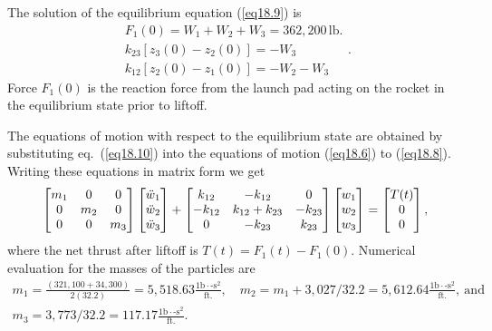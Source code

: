 \documentclass{AeroStructure-ERJohnson}
\begin{document}
The solution of the equilibrium equation (\ref{eq18.9}) is
\begin{equation}\label{eq18.10}
\begin{split}
F_{1}(0)=W_{1}+W_{2}+W_{3}=362{,}200\,\mathrm{lb}. \\k_{23}\left[z_{3}(0)-z_{2}(0)\right]=-W_{3} \\k_{12}\left[z_{2}(0)-z_{1}(0)\right]=-W_{2}-W_{3}
\end{split}.
\end{equation}
Force $F_{1}(0)$ is the reaction force from the launch pad acting on the rocket in the equilibrium state prior to liftoff.


The equations of motion with respect to the equilibrium state are obtained by substituting eq.~(\ref{eq18.10}) into the equations of motion (\ref{eq18.6}) to (\ref{eq18.8}). Writing these equations in matrix form we get
\begin{align}\label{eq18.11}
\left[\begin{array}{@{}ccc@{}}m_{1} & 0 & 0 \\0 & m_{2} & 0 \\0 & 0 & m_{3}\end{array}\right]\left[\begin{array}{@{}c@{}}\ddot{w}_{1} \\\ddot{w}_{2} \\\ddot{w}_{3}\end{array}\right]+\left[\begin{array}{@{}ccc@{}}k_{12} & -k_{12} & 0 \\-k_{12} & k_{12}+k_{23} & -k_{23} \\0 & -k_{23} & k_{23}\end{array}\right]\left[\begin{array}{@{}l@{}}w_{1} \\w_{2} \\w_{3}\end{array}\right]=\left[\begin{array}{@{}c@{}}T(t) \\0 \\0\end{array}\right],
\end{align}
where the net thrust after liftoff is $T(t)=F_{1}(t)-F_{1}(0)$. Numerical evaluation for the masses of the particles are
\begin{gather*}
m_{1}=\frac{(321{,}100+34{,}300)}{2(32.2)}=5,518.63 \frac{1\mathrm{b} \cdot\!\mbox{-}\mathrm{s}^{2}}{\mathrm{ft}.},\quad  m_{2}=m_{1}+3,027/32.2=5,612.64 \frac{1\mathrm{b} \cdot\!\mbox{-}\mathrm{s}^{2}}{\mathrm{ft}.},\ \text{and}\\
m_{3}=3,773/32.2=117.17 \frac{1\mathrm{b} \cdot\!\mbox{-}\mathrm{s}^{2}}{\mathrm{ft}.}.
\end{gather*}
\end{document}
